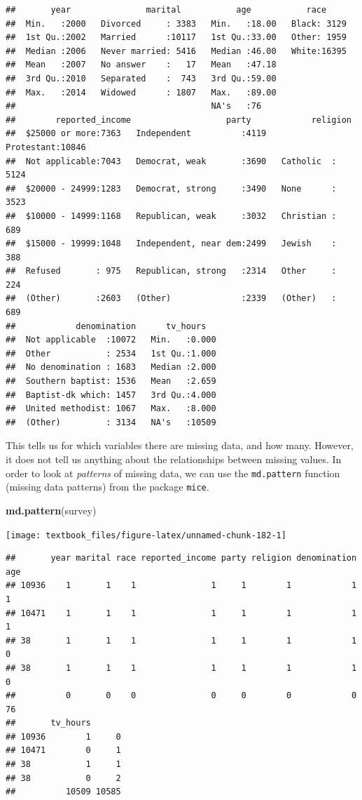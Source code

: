 \documentclass[]{tufte-book}
\newenvironment{Shaded}{}{}
\newcommand{\KeywordTok}[1]{\textcolor[rgb]{0.00,0.44,0.13}{\textbf{#1}}}
\newcommand{\NormalTok}[1]{#1}
\begin{document}
\begin{verbatim}
##       year               marital           age           race      
##  Min.   :2000   Divorced     : 3383   Min.   :18.00   Black: 3129  
##  1st Qu.:2002   Married      :10117   1st Qu.:33.00   Other: 1959  
##  Median :2006   Never married: 5416   Median :46.00   White:16395  
##  Mean   :2007   No answer    :   17   Mean   :47.18                
##  3rd Qu.:2010   Separated    :  743   3rd Qu.:59.00                
##  Max.   :2014   Widowed      : 1807   Max.   :89.00                
##                                       NA's   :76                   
##        reported_income                   party            religion    
##  $25000 or more:7363   Independent          :4119   Protestant:10846  
##  Not applicable:7043   Democrat, weak       :3690   Catholic  : 5124  
##  $20000 - 24999:1283   Democrat, strong     :3490   None      : 3523  
##  $10000 - 14999:1168   Republican, weak     :3032   Christian :  689  
##  $15000 - 19999:1048   Independent, near dem:2499   Jewish    :  388  
##  Refused       : 975   Republican, strong   :2314   Other     :  224  
##  (Other)       :2603   (Other)              :2339   (Other)   :  689  
##            denomination      tv_hours    
##  Not applicable  :10072   Min.   :0.000  
##  Other           : 2534   1st Qu.:1.000  
##  No denomination : 1683   Median :2.000  
##  Southern baptist: 1536   Mean   :2.659  
##  Baptist-dk which: 1457   3rd Qu.:4.000  
##  United methodist: 1067   Max.   :8.000  
##  (Other)         : 3134   NA's   :10509
\end{verbatim}

This tells us for which variables there are missing data, and how many. However, it does not tell us anything about the relationships between missing values. In order to look at \emph{patterns} of missing data, we can use the \texttt{md.pattern} function (missing data patterns) from the package \texttt{mice}.

\begin{Shaded}
\begin{Highlighting}[]
\KeywordTok{md.pattern}\NormalTok{(survey)}
\end{Highlighting}
\end{Shaded}

\texttt{[image: textbook\_files/figure-latex/unnamed-chunk-182-1]}

\begin{verbatim}
##       year marital race reported_income party religion denomination age
## 10936    1       1    1               1     1        1            1   1
## 10471    1       1    1               1     1        1            1   1
## 38       1       1    1               1     1        1            1   0
## 38       1       1    1               1     1        1            1   0
##          0       0    0               0     0        0            0  76
##       tv_hours      
## 10936        1     0
## 10471        0     1
## 38           1     1
## 38           0     2
##          10509 10585
\end{verbatim}
\end{document}
